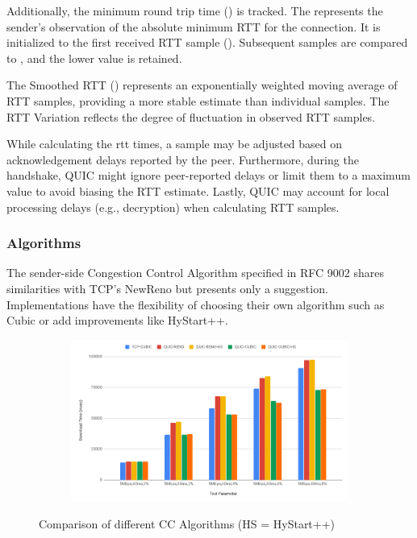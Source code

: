 Additionally, the minimum round trip time () is tracked. The  represents the sender's observation of the absolute
minimum RTT for the connection. It is initialized to the first received RTT sample (). Subsequent samples are compared
to , and the lower value is retained.

The Smoothed RTT () represents an exponentially weighted moving average of RTT samples, providing a more stable
estimate than individual samples. The RTT Variation  reflects the degree of fluctuation in observed RTT samples.

While calculating the rtt times, a sample may be adjusted based on acknowledgement delays reported by the peer. Furthermore, during the
handshake, QUIC might ignore peer-reported delays or limit them to a maximum value to avoid
biasing the RTT estimate. Lastly, QUIC may account for local processing delays (e.g., decryption) when calculating RTT samples.

\subsubsection{Algorithms}

The sender-side Congestion Control Algorithm specified in RFC 9002\cite[17]{rfc9002} shares similarities with TCP's
NewReno\cite[]{rfc6582} but presents only a suggestion. Implementations have the flexibility of choosing their own algorithm such as
Cubic\cite[]{rfc8312} or add improvements like HyStart++\cite[]{rfc9406}.

\begin{figure}[h]
    \centering
    \begin{subfigure}[b]{1.0\textwidth}
      \includegraphics[width=1.0\linewidth]{img/cc}
    \end{subfigure}
    \caption{Comparison of different CC Algorithms (HS = HyStart++) \cite[]{ccgraphic}}
    \label{cc_comparison}
\end{figure}

